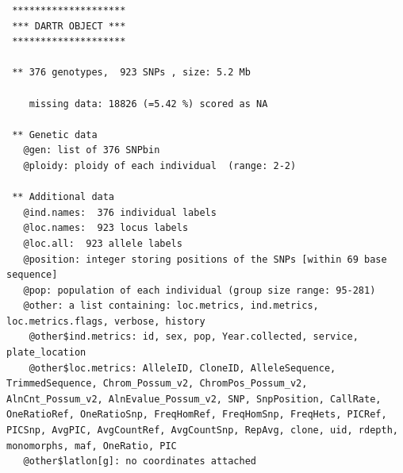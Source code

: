 \documentclass[
  letterpaper,
  DIV=11,
  numbers=noendperiod]{scrreprt}
\newenvironment{Shaded}{\begin{snugshade}}{\end{snugshade}}
\newcommand{\CommentTok}[1]{\textcolor[rgb]{0.38,0.63,0.69}{\textit{#1}}}
\newcommand{\FunctionTok}[1]{\textcolor[rgb]{0.02,0.16,0.49}{#1}}
\newcommand{\NormalTok}[1]{\textcolor[rgb]{0.00,0.44,0.13}{#1}}
\newcommand{\SpecialCharTok}[1]{\textcolor[rgb]{0.25,0.44,0.63}{#1}}
\begin{document}
\begin{Shaded}
\end{Shaded}

\begin{verbatim}
 ********************
 *** DARTR OBJECT ***
 ********************

 ** 376 genotypes,  923 SNPs , size: 5.2 Mb

    missing data: 18826 (=5.42 %) scored as NA

 ** Genetic data
   @gen: list of 376 SNPbin
   @ploidy: ploidy of each individual  (range: 2-2)

 ** Additional data
   @ind.names:  376 individual labels
   @loc.names:  923 locus labels
   @loc.all:  923 allele labels
   @position: integer storing positions of the SNPs [within 69 base sequence]
   @pop: population of each individual (group size range: 95-281)
   @other: a list containing: loc.metrics, ind.metrics, loc.metrics.flags, verbose, history 
    @other$ind.metrics: id, sex, pop, Year.collected, service, plate_location 
    @other$loc.metrics: AlleleID, CloneID, AlleleSequence, TrimmedSequence, Chrom_Possum_v2, ChromPos_Possum_v2, AlnCnt_Possum_v2, AlnEvalue_Possum_v2, SNP, SnpPosition, CallRate, OneRatioRef, OneRatioSnp, FreqHomRef, FreqHomSnp, FreqHets, PICRef, PICSnp, AvgPIC, AvgCountRef, AvgCountSnp, RepAvg, clone, uid, rdepth, monomorphs, maf, OneRatio, PIC 
   @other$latlon[g]: no coordinates attached
\end{verbatim}

\begin{Shaded}
\end{Shaded}
\end{document}
